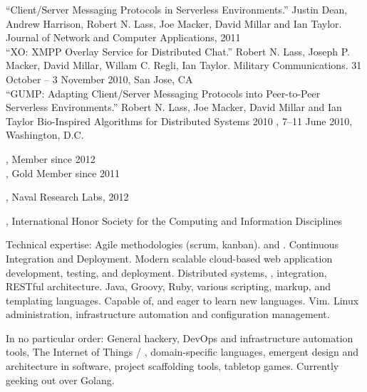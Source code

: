 \documentclass[10pt,a4paper]{article}
\begin{document}
\noindent ``Client/Server Messaging Protocols in Serverless Environments.'' Justin Dean, Andrew Harrison, Robert N. Lass, Joe Macker, David Millar and Ian Taylor. Journal of Network and Computer Applications, 2011 \\

\noindent ``XO: XMPP Overlay Service for Distributed Chat.'' Robert N. Lass, Joseph P. Macker, David Millar, Willam C. Regli, Ian Taylor. Military Communications. 31 October -- 3 November 2010, San Jose, CA \\

\noindent ``GUMP: Adapting Client/Server Messaging Protocols into Peer-to-Peer Serverless Environments.'' Robert N. Lass, Joe Macker, David Millar and Ian Taylor Bio-Inspired Algorithms for Distributed Systems 2010 , 7--11 June 2010, Washington, D.C. \\

\vspace{0.5em}
\spacedhrule{0.5em}{-0.4em}



\noindent{}, Member since 2012 \\
\noindent{}, Gold Member since 2011 \\
\vspace{0.5em}
\spacedhrule{0.5em}{-0.4em}


, Naval Research Labs, 2012

\noindent{}, International Honor Society for the Computing and Information Disciplines
\vspace{0.5em}
\spacedhrule{0.5em}{-0.4em}


\inlineheadsection  %
  {Technical expertise:}
  {
    Agile methodologies (scrum, kanban).
     and .
    Continuous Integration and Deployment.
    Modern scalable cloud-based web application development, testing, and deployment.
    Distributed systems, , integration, RESTful architecture.
    Java, Groovy, Ruby, various scripting, markup, and templating languages.  Capable of, and eager to learn new languages.
    Vim. Linux administration, infrastructure automation and configuration management.
  }

\spacedhrule{1.6em}{-0.4em}

\inlineheadsection
  {In no particular order:}
  {
    General hackery, DevOps and infrastructure automation tools,
    The Internet of Things / ,
    domain-specific languages,
    emergent design and architecture in software,
    project scaffolding tools,
    tabletop games.
    Currently geeking out over Golang.
  }
\end{document}
